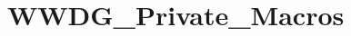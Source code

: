 \hypertarget{group___w_w_d_g___private___macros}{}\section{W\+W\+D\+G\+\_\+\+Private\+\_\+\+Macros}
\label{group___w_w_d_g___private___macros}
